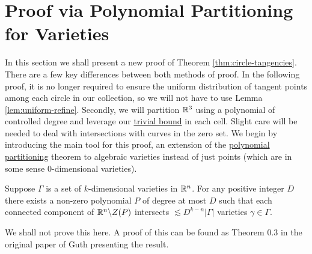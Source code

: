 \section{Proof via Polynomial Partitioning for Varieties}
In this section we shall present a new proof of Theorem \ref{thm:circle-tangencies}. 
There are a few key differences between both methods of proof. In the following proof, 
it is no longer required to ensure the uniform distribution of tangent points among each circle in our collection, so we will not
have to use Lemma \ref{lem:uniform-refine}.
Secondly, we will partition $\mathbb R^3$ using a polynomial of controlled degree and leverage our \hyperref[thm:trivial-circle-bound]{trivial bound} in each cell.
Slight care will be needed to deal with intersections with curves in the zero set. We begin by introducing the main tool for this proof, 
an extension of the \hyperref[thm:PolyPartioning]{polynomial partitioning} theorem to algebraic varieties instead of just points (which are in some sense 0-dimensional varieties). 

\begin{lemma}
    Suppose $\Gamma$ is a set of $k$-dimensional varieties in $\mathbb R^n$. For any positive integer $D$ there exists a non-zero polynomial $P$ of degree at
    most $D$ such that each connected component of $\mathbb R^n \backslash Z(P)$ intersects $\lesssim D^{k-n} |\Gamma|$ varieties $\gamma \in \Gamma$.
    \label{lem:poly-part-var}
\end{lemma}
We shall not prove this here. A proof of this can be found as Theorem 0.3 in the original paper of Guth presenting the result.\cite{guth2015polypartvar}


